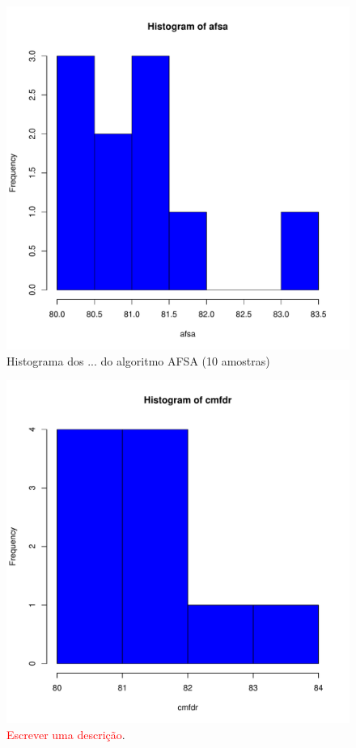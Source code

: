\documentclass[conference]{IEEEtran}
\begin{document}
\begin{figure}[h]
	\centering
	\includegraphics[width=\linewidth]{img/bluehist_afsa.pdf}
	\caption{Histograma dos ... do algoritmo AFSA (10 amostras)}
	\label{fig:hist_afsa}
\end{figure}

\begin{figure}[h]
	\centering
	\includegraphics[width=\linewidth]{img/bluehist_cmfdr.pdf}
	\caption{\textcolor{red}{Escrever uma descrição}.}
	\label{fig:hist_cmfdr}
\end{figure}
\end{document}
